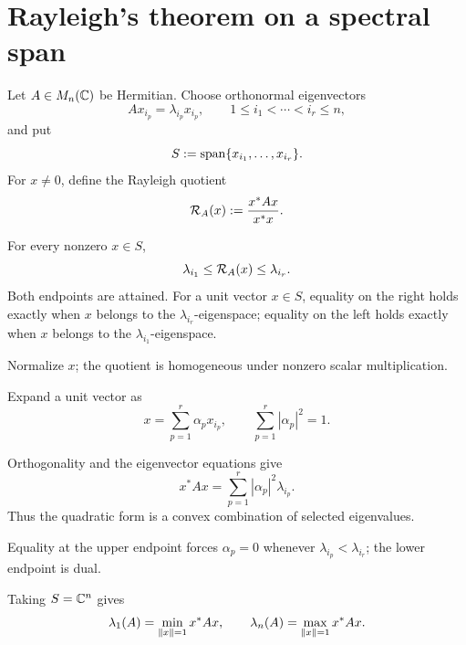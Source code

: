 \section{Rayleigh's theorem on a spectral span}


Let $A\in M_n(\mathbb{C})$ be Hermitian. Choose orthonormal eigenvectors
\[
  Ax_{i_p}=\lambda_{i_p}x_{i_p},
  \qquad 1\le i_1<\cdots<i_r\le n,
\]
and put
\[
  S:=\operatorname{span}\{x_{i_1},\dots,x_{i_r}\}.
\]
For $x\ne0$, define the Rayleigh quotient
\[
  \mathcal{R}_{A}(x):=\frac{x^*Ax}{x^*x}.
\]

\begin{theorem}
For every nonzero $x\in S$,
\[
  \lambda_{i_1}\le \mathcal{R}_{A}(x)\le\lambda_{i_r}.
\]
Both endpoints are attained. For a unit vector $x\in S$, equality on the right holds exactly when $x$ belongs to the $\lambda_{i_r}$-eigenspace; equality on the left holds exactly when $x$ belongs to the $\lambda_{i_1}$-eigenspace.
\end{theorem}

\begin{argument}
\item Normalize $x$; the quotient is homogeneous under nonzero scalar multiplication.
\item Expand a unit vector as
\[
  x=\sum_{p=1}^r\alpha_p x_{i_p},
  \qquad \sum_{p=1}^r|\alpha_p|^2=1.
\]
\item Orthogonality and the eigenvector equations give
\begin{equation}
  x^*Ax=\sum_{p=1}^r|\alpha_p|^2\lambda_{i_p}. \tag{HJ-Rayleigh-convex}
\end{equation}
Thus the quadratic form is a convex combination of selected eigenvalues.
\item Equality at the upper endpoint forces $\alpha_p=0$ whenever $\lambda_{i_p}<\lambda_{i_r}$; the lower endpoint is dual.
\end{argument}

Taking $S=\mathbb{C}^n$ gives
\[
  \lambda_1(A)=\min_{\left\lVert x\right\rVert=1}x^*Ax,
  \qquad
  \lambda_n(A)=\max_{\left\lVert x\right\rVert=1}x^*Ax.
\]


